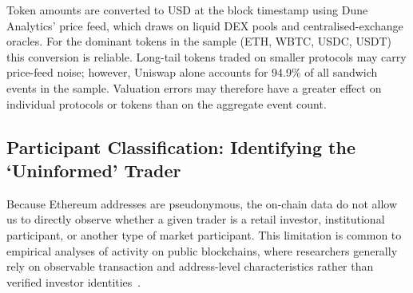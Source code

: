 \documentclass[pdflatex, sn-basic]{sn-jnl}
\theoremstyle{thmstylethree}%
\begin{document}
    Token amounts are converted to USD at the block timestamp using Dune Analytics' price feed, which draws on liquid \ac{DEX} pools and centralised-exchange oracles.
    For the dominant tokens in the sample (ETH, WBTC, USDC, USDT) this conversion is reliable.
    Long-tail tokens traded on smaller protocols may carry price-feed noise; however, Uniswap alone accounts for \num{94.9}\% of all sandwich events in the sample.
    Valuation errors may therefore have a greater effect on individual protocols or tokens than on the aggregate event count.



	\subsection{Participant Classification: Identifying the `Uninformed' Trader}
	\label{subsec:trader-classification}




    Because Ethereum addresses are pseudonymous, the on-chain data do not allow us to directly observe whether a given trader is a retail investor, institutional participant, or another type of market participant.
    This limitation is common to empirical analyses of activity on public blockchains, where researchers generally rely on observable transaction and address-level characteristics rather than verified investor identities~\citep{FerreiraTorres2021}.
\end{document}
